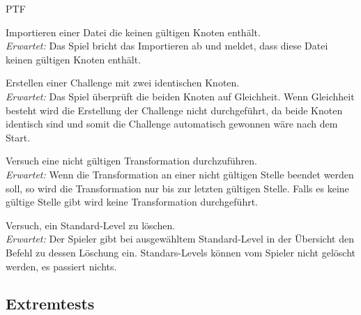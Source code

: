 \begin{ids}{\gls{PTF}}

	\id[500] Importieren einer Datei die keinen gültigen Knoten enthält.\\
	
	\textit{Erwartet:} Das Spiel bricht das Importieren ab und meldet, dass diese Datei keinen gültigen Knoten enthält.
	
	\id[510] Erstellen einer Challenge mit zwei identischen Knoten.\\
	
	\textit{Erwartet:} Das Spiel überprüft die beiden Knoten auf Gleichheit. Wenn Gleichheit besteht wird die Erstellung der Challenge nicht durchgeführt, da beide Knoten identisch sind und somit die Challenge automatisch gewonnen wäre nach dem Start.
	
	\id[520] Versuch eine nicht gültigen Transformation durchzuführen.\\
	
	\textit{Erwartet:} Wenn die Transformation an einer nicht gültigen Stelle beendet werden soll, so wird die Transformation nur bis zur letzten gültigen Stelle. Falls es keine gültige Stelle gibt wird keine Transformation durchgeführt.
	
	\id[530] Versuch, ein Standard-Level zu löschen.\\
	
	\textit{Erwartet:} Der Spieler gibt bei ausgewähltem Standard-Level in der Übersicht den Befehl zu dessen Löschung ein. Standars-Levels können vom Spieler nicht gelöscht werden, es passiert nichts.

\end{ids}


\clearpage


%
%
\subsection{Extremtests}

\vspace{1em}

